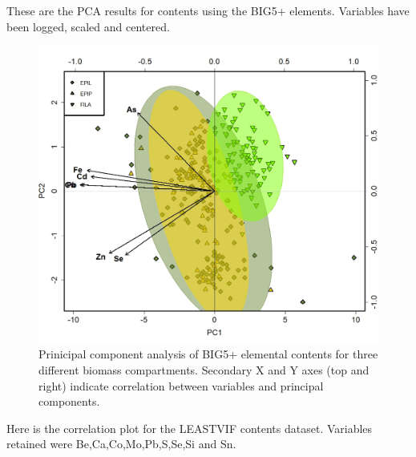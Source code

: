 \documentclass[
]{article}
\begin{document}
These are the PCA results for contents using the BIG5+ elements.
Variables have been logged, scaled and centered.

\begin{figure}
\includegraphics[width=1\linewidth]{Figures/PCA_1_BIG5PLUS} \caption[Prinicipal component analysis of BIG5+ elemental contents for three different biomass compartments]{Prinicipal component analysis of BIG5+ elemental contents for three different biomass compartments. Secondary X and Y axes (top and right) indicate correlation between variables and principal components.}\label{fig:unnamed-chunk-10}
\end{figure}

\FloatBarrier

\newpage

Here is the correlation plot for the LEASTVIF contents dataset.
Variables retained were Be,Ca,Co,Mo,Pb,S,Se,Si and Sn.
\end{document}
